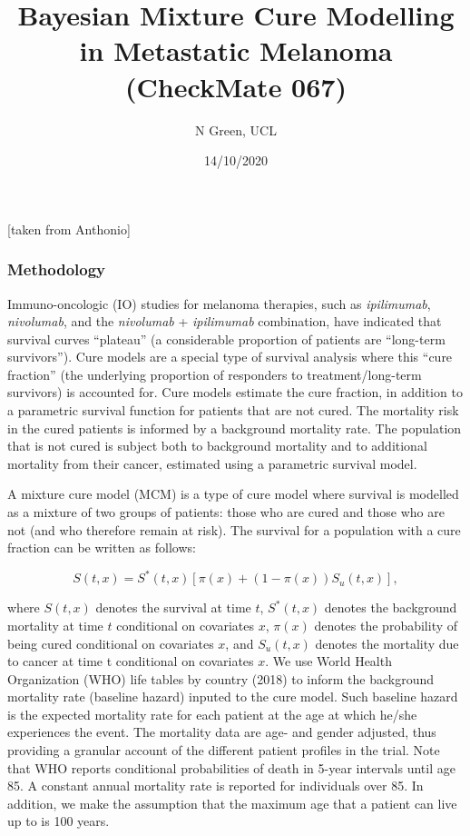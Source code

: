 \documentclass[
]{article}
\title{Bayesian Mixture Cure Modelling in Metastatic Melanoma (CheckMate
067)}
\author{N Green, UCL}
\date{14/10/2020}
\begin{document}
\maketitle

{[}taken from Anthonio{]}

\hypertarget{methodology}{%
\subsubsection{Methodology}\label{methodology}}

Immuno-oncologic (IO) studies for melanoma therapies, such as
\emph{ipilimumab}, \emph{nivolumab}, and the \emph{nivolumab} +
\emph{ipilimumab} combination, have indicated that survival curves
``plateau'' (a considerable proportion of patients are ``long-term
survivors''). Cure models are a special type of survival analysis where
this ``cure fraction'' (the underlying proportion of responders to
treatment/long-term survivors) is accounted for. Cure models estimate
the cure fraction, in addition to a parametric survival function for
patients that are not cured. The mortality risk in the cured patients is
informed by a background mortality rate. The population that is not
cured is subject both to background mortality and to additional
mortality from their cancer, estimated using a parametric survival
model.

A mixture cure model (MCM) is a type of cure model where survival is
modelled as a mixture of two groups of patients: those who are cured and
those who are not (and who therefore remain at risk). The survival for a
population with a cure fraction can be written as follows:

\begin{equation}
S(t, x) = S^*(t, x)[\pi(x) + (1 − \pi(x))S_u(t, x)],
\end{equation}

where \(S(t, x)\) denotes the survival at time \(t\), \(S^*(t, x)\)
denotes the background mortality at time \(t\) conditional on covariates
\(x\), \(\pi(x)\) denotes the probability of being cured conditional on
covariates \(x\), and \(S_u(t, x)\) denotes the mortality due to cancer
at time t conditional on covariates \(x\). We use World Health
Organization (WHO) life tables by country (2018) to inform the
background mortality rate (baseline hazard) inputed to the cure model.
Such baseline hazard is the expected mortality rate for each patient at
the age at which he/she experiences the event. The mortality data are
age- and gender adjusted, thus providing a granular account of the
different patient profiles in the trial. Note that WHO reports
conditional probabilities of death in 5-year intervals until age 85. A
constant annual mortality rate is reported for individuals over 85. In
addition, we make the assumption that the maximum age that a patient can
live up to is 100 years.
\end{document}
